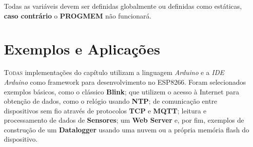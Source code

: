 \documentclass[
	11pt,				%
	openright,			%
	twoside,			%
	a5paper,			%
	english,			%
	french,				%
	spanish,			%
	brazil,				%
	sumario=tradicional
]{abntex2}
\begin{document}
    
\begin{tcolorbox}[colbacktitle=yellow!60!white,
title={\vspace{-13pt}\texttt{[image: exclamacao.png]} \hspace{2pt} \textsf{\textbf{ATENÇÃO!}\vspace{2pt}}},coltitle=black, colback=white,arc=4mm, outer arc=3.5mm]
\raggedright
 Todas as variáveis devem ser definidas globalmente ou definidas como estáticas, \textbf{\textsf{caso contrário}} o \textsf{\textbf{PROGMEM}} não funcionará.
\end{tcolorbox}
    













\chapter{Exemplos e Aplicações}
\lettrine[nindent=0.35em,lhang=0.40,loversize=0.3]{T}{odas} implementações do capítulo utilizam a linguagem \textit{Arduino} e a \textit{IDE Arduino} como framework para desenvolvimento no ESP8266. Foram selecionados exemplos básicos, como o clássico \textbf{\textsf{Blink}}; que utilizem o acesso à Internet para obtenção de dados, como o relógio usando \textbf{\textsf{NTP}}; de comunicação entre dispositivos sem fio através de protocolos\textbf{ \textsf{TCP}} e \textbf{\textsf{MQTT}}; leitura e processamento de dados de \textbf{\textsf{Sensores}}; um \textbf{\textsf{Web Server}} e, por fim, exemplos de construção de um \textbf{\textsf{Datalogger}} usando uma nuvem ou a própria memória flash do dispositivo.

\newpage
\end{document}
